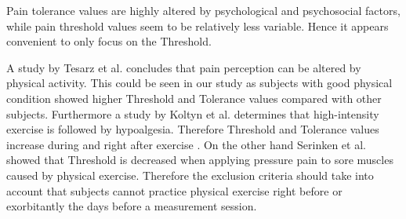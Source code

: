 Pain tolerance values are highly altered by psychological and psychosocial factors, while pain threshold values seem to be relatively less
variable. Hence it appears convenient to only focus on the Threshold. \cite{Yarnitsky2006}

A study by Tesarz et al. \cite{Tesarz2012} concludes that pain perception can be altered by physical activity. This could be seen in our study as subjects with good physical condition showed higher Threshold and Tolerance values compared with other subjects.
Furthermore a study by Koltyn et al. \cite{Koltyn2002} determines that high-intensity exercise is followed by hypoalgesia. Therefore Threshold and Tolerance values increase during and right after exercise \cite{Koltyn2002}. On the other hand Serinken et al. \cite{Serinken2013} showed that Threshold is decreased when applying pressure pain to sore muscles caused by physical exercise. Therefore the exclusion criteria should take into account that subjects cannot practice physical exercise right before or exorbitantly the days before a measurement session.

